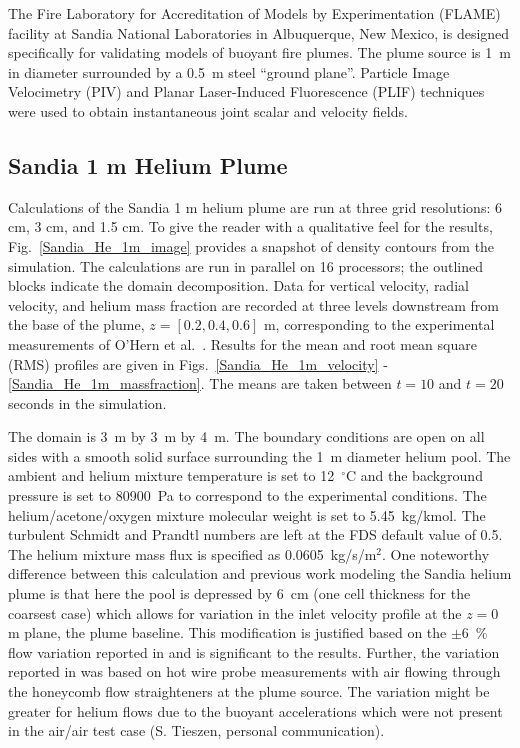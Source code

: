 The Fire Laboratory for Accreditation of Models by Experimentation (FLAME) facility \cite{OHern:2005,Blanchat:2001} at Sandia National Laboratories in Albuquerque, New Mexico, is designed specifically for validating models of buoyant fire plumes.  The plume source is 1~m in diameter surrounded by a 0.5~m steel ``ground plane''. Particle Image Velocimetry (PIV) and Planar Laser-Induced Fluorescence (PLIF) techniques were used to obtain instantaneous joint scalar and velocity fields.

\subsection{Sandia 1 m Helium Plume}
\label{Sandia plume}

Calculations of the Sandia 1 m helium plume are run at three grid resolutions: 6 cm, 3 cm, and 1.5 cm.  To give the reader with a qualitative feel for the results, Fig.~\ref{Sandia_He_1m_image} provides a snapshot of density contours from the simulation. The calculations are run in parallel on 16 processors; the outlined blocks indicate the domain decomposition.  Data for vertical velocity, radial velocity, and helium mass fraction are recorded at three levels downstream from the base of the plume, $z = [0.2, 0.4, 0.6]$ m, corresponding to the experimental measurements of O'Hern et al.~\cite{OHern:2005}.  Results for the mean and root mean square (RMS) profiles are given in Figs.~\ref{Sandia_He_1m_velocity} - \ref{Sandia_He_1m_massfraction}.  The means are taken between $t=10$ and $t=20$ seconds in the simulation.

The domain is 3~m by 3~m by 4~m. The boundary conditions are open on all sides with a smooth solid surface surrounding the 1~m diameter helium pool.  The ambient and helium mixture temperature is set to 12~$^\circ$C and the background pressure is set to 80900~Pa to correspond to the experimental conditions.  The helium/acetone/oxygen mixture molecular weight is set to 5.45~kg/kmol.  The turbulent Schmidt and Prandtl numbers are left at the FDS default value of 0.5.  The helium mixture mass flux is specified as 0.0605~kg/s/m$^2$.  One noteworthy difference between this calculation and previous work modeling the Sandia helium plume \cite{DesJardin:2004} is that here the pool is depressed by 6~cm (one cell thickness for the coarsest case) which allows for variation in the inlet velocity profile at the $z=0$ m plane, the plume baseline.  This modification is justified based on the $\pm 6$~\% flow variation reported in \cite{Blanchat:2001} and is significant to the results.  Further, the variation reported in \cite{Blanchat:2001} was based on hot wire probe measurements with air flowing through the honeycomb flow straighteners at the plume source.  The variation might be greater for helium flows due to the buoyant accelerations which were not present in the air/air test case (S. Tieszen, personal communication).

